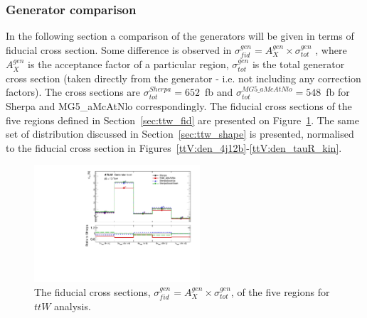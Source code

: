 %
%
%
%
%
\subsubsection{Generator comparison}
\label{sec:ttw_gen}

In the following section a comparison of the generators will be given in terms of fiducial cross section. Some difference is observed in $\sigma_{fid}^{gen}=A_X^{gen}\times \sigma_{tot}^{gen}$ , where $A_X^{gen}$ is the acceptance factor of a particular region, $\sigma_{tot}^{gen}$ is the total generator cross section (taken directly from the generator - i.e. not including any correction factors). The cross sections are $\sigma_{tot}^{Sherpa}=652$~fb and $\sigma_{tot}^{MG5\_aMcAtNlo}=548$~fb for Sherpa and MG5\_aMcAtNlo correspondingly. The fiducial cross sections of the five regions defined in Section~\ref{sec:ttw_fid} are presented on Figure~\ref{ttV:fid_xs}.
The same set of distribution discussed in Section~\ref{sec:ttw_shape} is presented, normalised to the fiducial cross section in Figures~\ref{ttV:den_4j12b}-\ref{ttV:den_tauR_kin}.

\begin{figure}[!htb]
\centering
\includegraphics[width=0.55\textwidth]{Plots/ttV/generator/acc_7f}
  \caption{The fiducial cross sections, $\sigma_{fid}^{gen}=A_X^{gen}\times \sigma_{tot}^{gen}$,  of the five regions for $ttW$ analysis. \label{ttV:fid_xs}}
\end{figure}


